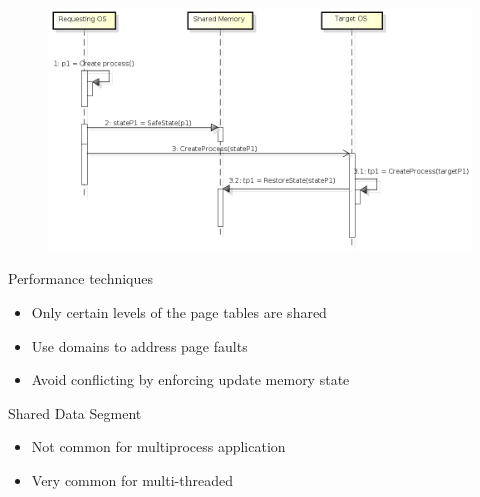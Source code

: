 \documentclass{beamer}
\begin{document}
	\begin{frame}[plain]
		\begin{figure} [H]
			\centering
			\includegraphics[scale=0.46]{img/cerberus-process-creation}
		\end{figure}
	\end{frame}
	
	\begin{frame}{Performance techniques}

	\begin{itemize}
	\item Only certain levels of the page tables are shared
	\item Use domains to address page faults
	\item Avoid conflicting by enforcing update memory state
	\end{itemize}
	
	\end{frame}
	
	\begin{frame}{Shared Data Segment}
	
	\begin{itemize}	
		\item Not common for multiprocess application
		\item Very common for multi-threaded
	\end{itemize}	
		
	\end{frame}
\end{document}
